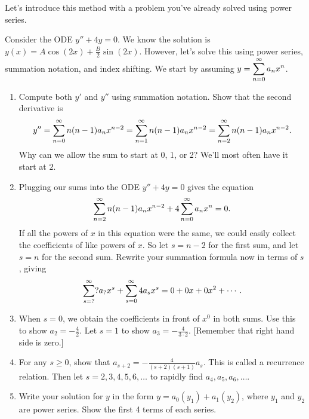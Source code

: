 Let's introduce this method with a problem you've already solved using power series.
\begin{problem}
 Consider the ODE $y''+4y=0$.  We know the solution is $y(x) = A\cos(2x)+\frac{B}{2}\sin(2x)$.  However, let's solve this using power series, summation notation, and index shifting. We start by assuming 
$\displaystyle y = \sum_{n=0}^\infty a_n x^n$.  
\begin{enumerate}
 \item Compute both $y'$ and $y''$ using summation notation. Show that the second derivative is
$$\displaystyle y'' = \sum_{n=0}^\infty n(n-1)a_nx^{n-2} =\sum_{n=1}^\infty n(n-1)a_nx^{n-2} =\sum_{n=2}^\infty n(n-1)a_nx^{n-2}. $$
Why can we allow the sum to start at 0, 1, or 2?  We'll most often have it start at $2$.
 \item Plugging our sums into the ODE $y''+4y=0$ gives the equation 
$$\sum_{n=2}^\infty n(n-1)a_nx^{n-2} + 4\displaystyle \sum_{n=0}^\infty a_n x^n=0.$$
 If all the powers of $x$ in this equation were the same, we could easily collect the coefficients of like powers of $x$.  
 So let $s=n-2$ for the first sum, and let $s=n$ for the second sum. 
 Rewrite your summation formula now in terms of $s$, giving
$$\sum_{s=?}^\infty ?a_?x^{s} + \displaystyle \sum_{s=0}^\infty 4a_s x^s=0+0x+0x^2+\cdots.$$
 \item 
When $s=0$, we obtain the coefficients in front of $x^0$ in both sums. Use this to show $a_2 = -\frac{4}{2}$.
Let $s=1$ to show $a_3 = -\frac{4}{3\cdot 2}$. [Remember that right hand side is zero.]
 \item For any $s\geq 0$, show that $a_{s+2}=-\frac{4}{(s+2)(s+1)}a_s$. This is called a recurrence relation. Then let $s=2,3,4,5,6,\ldots$ to rapidly find $a_4, a_5, a_6, \ldots$.
 \item Write your solution for $y$ in the form $y = a_0(y_1)+a_1(y_2)$, where $y_1$ and $y_2$ are power series. Show the first 4 terms of each series.      
\end{enumerate}

\end{problem}

